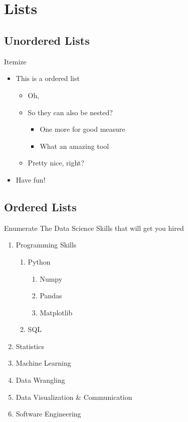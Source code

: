 \documentclass[aspectratio=169,envcountsect]{beamer}    %
\newcommand*{\TocSplit}{9}
\newcommand{\OstToc}[1][]{
	\IfInteger{\TocSplit}
	{
		\tikzmath{integer \nextsection; \nextsection = \TocSplit + 1;}
		\begin{columns}[t]
			\begin{column}{0.5\textwidth}
				\tableofcontents[sections=1-\TocSplit, #1]
			\end{column}
			\begin{column}{0.49\textwidth}
				\tableofcontents[sections=\nextsection-, #1]
			\end{column}
		\end{columns}
	}
	{\tableofcontents}
}
\begin{document}
\frame[plain]{\titlepage}

\section*{\contentsname}
\begin{frame}
	\OstToc
\end{frame}

\section{Lists}
\subsection{Unordered Lists}
\begin{frame}{Itemize}
    \begin{itemize}
    	\item This is a ordered list
    	\begin{itemize}
    		\item Oh,
    		\item So they can also be nested?
    		\begin{itemize}
    			\item One more for good measure
    			\item What an amazing tool
    		\end{itemize}
    		\item Pretty nice, right?
    	\end{itemize}
    	\item Have fun!
    \end{itemize}
\end{frame}

\subsection{Ordered Lists}
\begin{frame}{Enumerate}
	The Data Science Skills that will get you hired
    \begin{enumerate}
        \item Programming Skills
        \begin{enumerate}
        	\item Python
        	\begin{enumerate}
        		\item Numpy
        		\item Pandas
        		\item Matplotlib
        	\end{enumerate}
        	\item SQL
        \end{enumerate}
        \item Statistics
        \item Machine Learning
        \item Data Wrangling
        \item Data Visualization \& Communication
        \item Software Engineering
    \end{enumerate}
\end{frame}
\end{document}
